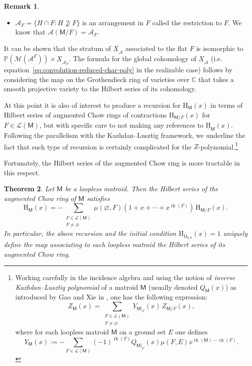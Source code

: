\documentclass[11pt, a4paper, english]{amsart}
\theoremstyle{teoremas}
\newtheorem{theorem}{Theorem}[section]
\theoremstyle{definition}
\newtheorem{remark}[theorem]{Remark}
\DeclareMathOperator{\rk}{rk}
\newcommand{\M}{\mathsf{M}}
\newcommand{\U}{\mathsf{U}}
\renewcommand{\H}{\mathrm{H}}
\newcommand{\uH}{\underline{\mathrm{H}}}
\begin{document}
\begin{remark}
\begin{itemize}
        \item $\mathcal{A}_F = \{H \cap F : H \not\supseteq F\} $ is an arrangement in $F$ called the restriction to $F$. We know that $\mathcal{A}(\M/F) = \mathcal{A}_F$.
    \end{itemize}
    It can be shown that the stratum of $\underline{X}_{\mathcal{A}}$ associated to the flat $F$ is isomorphic to $\mathbb{P}(\mathcal{M}(\mathcal{A}^F)) \times \underline{X}_{\mathcal{A}_F}$.
    The formula for the global cohomology of $\underline{X}_\mathcal{A}$ (i.e.  equation~\eqref{eq:convolution-reduced-char-poly} in the realizable case) follows by considering the map on the Grothendieck ring of varieties over $\mathbb{C}$ that takes a smooth projective variety to the Hilbert series of its cohomology.
\end{remark}


At this point it is also of interest to produce a recursion for $\H_{\M}(x)$ in terms of Hilbert series of augmented Chow rings of contractions $\H_{\M/F}(x)$ for $F\in\mathcal{L}(\M)$, but with specific care to not making any references to $\uH_{\M}(x)$. Following the parallelism with the Kazhdan--Lusztig framework, we underline the fact that such type of recursion is certainly complicated for the $Z$-polynomial.\footnote{
    Working carefully in the incidence algebra and using the notion of \emph{inverse Kazhdan--Lusztig polynomial} of a matroid $\M$ (usually denoted $Q_{\M}(x)$) as introduced by Gao and Xie in \cite{gao-xie}, one has the following expression:
    \[ Z_{\M}(x) = \sum_{\substack{F\in\mathcal{L}(\M)\\F\neq\varnothing}} Y_{\M|_F}(x)\, Z_{\M/F}(x),\]
    where for each loopless matroid $\M$ on a ground set $E$ one defines
    \[ Y_{\M}(x) := -\sum_{F\in\mathcal{L}(\M)} (-1)^{\rk(F)} Q_{\M|_F}(x) \mu(F,E) x^{\rk(\M)-\rk(F)}.\]
}

Fortunately, the Hilbert series of the augmented Chow ring is more tractable in this respect.

\begin{theorem}\label{thm:convolution-mobius}
     Let $\M$ be a loopless matroid. Then the Hilbert series of the augmented Chow ring of $\M$ satisfies  
    \begin{equation} 
        \H_{\M}(x) = - \sum_{\substack{F\in\mathcal{L}(\M)\\F\neq\varnothing}} \mu(\varnothing,F) (1+x+\cdots+ x^{\rk(F)}) \, \H_{\M/F}(x).\label{eq:convolution-mobius}
    \end{equation}
    In particular, the above recursion and the initial condition $\H_{\U_{0,0}}(x)=1$  uniquely define the map associating to each loopless matroid the Hilbert series of its augmented Chow ring. 
\end{theorem}
\end{document}
